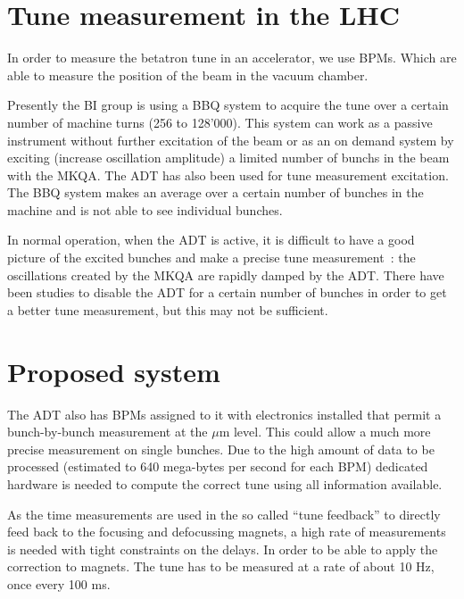 \section{Tune measurement in the LHC}

In order to measure the betatron tune in an accelerator, we use \glspl{BPM}. Which are able to measure the position of the beam in the vacuum chamber.

Presently the \gls{BI} group is using a \gls{BBQ} \cite{Boccardi:1156349} system to acquire the tune over a certain number of machine turns (256 to 128'000). This system can work as a passive instrument without further excitation of the beam or as an on demand system by exciting (increase oscillation amplitude) a limited number of \glspl{bunch} in the beam with the \gls{MKQA}. The \Gls{ADT} has also been used for tune measurement excitation\cite{HofleEvian10}. The \gls{BBQ} system makes an average over a certain number of bunches in the machine and is not able to see individual bunches.

In normal operation, when the \gls{ADT} is active, it is difficult to have a good picture of the excited bunches and make a precise tune measurement~: the oscillations created by the \gls{MKQA} are rapidly damped by the \gls{ADT}. There have been studies to disable the \gls{ADT} for a certain number of bunches in order to get a better tune measurement\cite{HofleEvian11}, but this may not be sufficient.

\section{Proposed system}

The \gls{ADT} also has \glspl{BPM} assigned to it with electronics installed that permit a bunch-by-bunch measurement at the $\mu$m level\cite{BphMeas07}. This could allow a much more precise measurement on single bunches. Due to the high amount of data to be processed (estimated to 640 mega-bytes per second for each \gls{BPM}) dedicated hardware is needed to compute the correct tune using all information available\cite{HofleChamonix12}.

As the time measurements are used in the so called ``tune feedback'' to directly feed back to the focusing and defocussing magnets, a high rate of measurements is needed with tight constraints on the delays. In order to be able to apply the correction to magnets. The \gls{tune} has to be measured at a rate of about 10 Hz, once every 100 ms.

